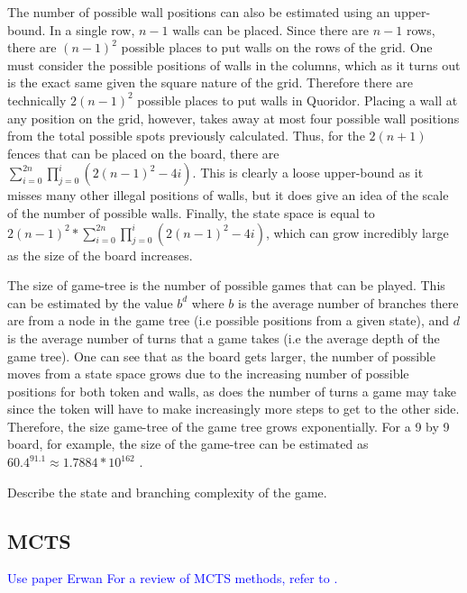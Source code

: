 \documentclass[journal, a4paper]{IEEEtran}
\begin{document}
The number of possible wall positions can also be estimated using an upper-bound. In a single row, $n-1$ walls can be placed. Since there are $n-1$ rows, there are $(n-1)^{2}$ possible places to put walls on the rows of the grid. One must consider the possible positions of walls in the columns, which as it turns out is the exact same given the square nature of the grid. Therefore there are technically $2(n-1)^{2}$ possible places to put walls in Quoridor. 
Placing a wall at any position on the grid, however, takes away at most four possible wall positions from the total possible spots previously calculated. Thus, for the $2(n+1)$ fences that can be placed on the board, there are $\sum_{i=0}^{2n} \prod_{j=0}^{i}(2(n-1)^2 - 4i)$. This is clearly a loose upper-bound as it misses many other illegal positions of walls, but it does give an idea of the scale of the number of possible walls. Finally, the state space is equal to $2(n-1)^{2} * \sum_{i=0}^{2n} \prod_{j=0}^{i}(2(n-1)^2 - 4i)$, which can grow incredibly large as the size of the board increases.

The size of game-tree is the number of possible games that can be played. This can be estimated by the value $b^{d}$ where $b$ is the average number of branches there are from a node in the game tree (i.e possible positions from a given state), and $d$ is the average number of turns that a game takes (i.e the average depth of the game tree). One can see that as the board gets larger, the number of possible moves from a state space grows due to the increasing number of possible positions for both token and walls, as does the number of turns a game may take since the token will have to make increasingly more steps to get to the other side. 
Therefore, the size game-tree of the game tree grows exponentially. For a 9 by 9 board, for example, the size of the game-tree can be estimated as $60.4^{91.1} \approx 1.7884 * 10^{162}$ \cite{mastering-quoridor}.


Describe the state and branching complexity of the game. 

\subsection{MCTS}
\label{ssec:mcts}
\textcolor{blue}{Use paper Erwan \cite{mc-rave}
For a review of MCTS methods, refer to \cite{mcts-review}.}
\end{document}
